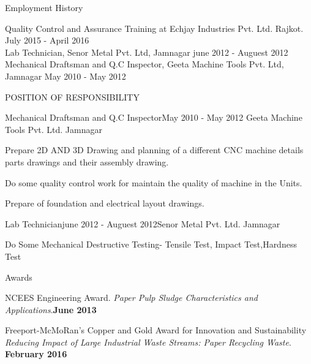 \documentclass{resume} %
\begin{document}
\begin{rSection}{Employment History} \itemsep -3pt  

{Quality Control and Assurance Training at Echjay Industries Pvt. Ltd. Rajkot.} \hfill July 2015 - April 2016 \\ 
{Lab Technician, Senor Metal Pvt. Ltd, Jamnagar} \hfill june 2012 - Auguest 2012\\
{Mechanical Draftsman and Q.C Inspector, Geeta Machine Tools Pvt. Ltd, Jamnagar} \hfill May 2010 - May 2012 \\
\end{rSection} 

\begin{rSection}{POSITION OF RESPONSIBILITY}

\begin{rSubsection}{Mechanical Draftsman and Q.C Inspector}{May 2010 - May 2012} {Geeta Machine Tools Pvt. Ltd. Jamnagar} {} 
\item Prepare 2D AND 3D Drawing and planning of a different CNC machine details
parts drawings and their assembly drawing.
\item Do some quality control work for maintain the quality of machine in the Units.
\item Prepare of foundation and electrical layout drawings.
\end{rSubsection}



\begin{rSubsection}{Lab Technician}{june 2012 - Auguest 2012}{Senor Metal Pvt. Ltd. Jamnagar} {}
 \item Do Some Mechanical Destructive Testing- Tensile Test, Impact Test,Hardness Test
\end{rSubsection}
 
\end{rSection}

\begin{rSection}{Awards} \itemsep -1pt {}   

\item NCEES Engineering Award. {\sl Paper Pulp Sludge Characteristics and Applications}.\hfill {\bf June 2013}
\item Freeport-McMoRan's Copper and Gold Award for Innovation and Sustainability {\sl Reducing Impact
	 of Large Industrial Waste Streams: Paper Recycling Waste}. \hfill {\bf February 2016}

 

\end{rSection}
\end{document}
